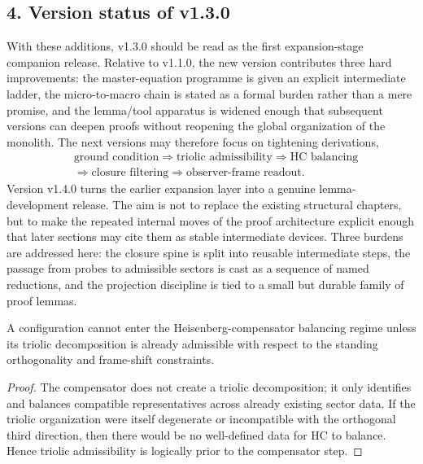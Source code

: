 \subsection*{4. Version status of v1.3.0}
With these additions, v1.3.0 should be read as the first expansion-stage
companion release. Relative to v1.1.0, the new version contributes three hard
improvements: the master-equation programme is given an explicit intermediate
ladder, the micro-to-macro chain is stated as a formal burden rather than a
mere promise, and the lemma/tool apparatus is widened enough that subsequent
versions can deepen proofs without reopening the global organization of the
monolith. The next versions may therefore focus on tightening derivations,
\[
\begin{aligned}
&\text{ground condition}
\Longrightarrow
\text{triolic admissibility}
\Longrightarrow
\text{HC balancing}
\\[0.2em]
&\Longrightarrow
\text{closure filtering}
\Longrightarrow
\text{observer-frame readout}.
\end{aligned}
\]
Version v1.4.0 turns the earlier expansion layer into a genuine
lemma-development release. The aim is not to replace the existing structural
chapters, but to make the repeated internal moves of the proof architecture
explicit enough that later sections may cite them as stable intermediate
devices. Three burdens are addressed here: the closure spine is split into
reusable intermediate steps, the passage from probes to admissible sectors is
cast as a sequence of named reductions, and the projection discipline is tied
to a small but durable family of proof lemmas.


\begin{lemma}
\label{lem:triolic-before-hc}
A configuration cannot enter the Heisenberg-compensator balancing regime unless
its triolic decomposition is already admissible with respect to the standing
orthogonality and frame-shift constraints.
\end{lemma}

\begin{proof}
The compensator does not create a triolic decomposition; it only identifies and
balances compatible representatives across already existing sector data. If the
triolic organization were itself degenerate or incompatible with the orthogonal
third direction, then there would be no well-defined data for HC to balance.
Hence triolic admissibility is logically prior to the compensator step.
\end{proof}

